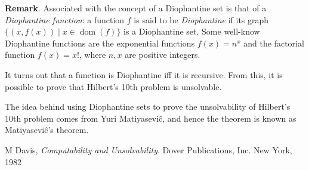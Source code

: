 \documentclass[12pt]{article}
\begin{document}
\textbf{Remark}.  Associated with the concept of a Diophantine set is that of a \emph{Diophantine function}: a function $f$ is said to be \emph{Diophantine} if its graph $\lbrace (x,f(x)) \mid x\in \operatorname{dom}(f)\rbrace$ is a Diophantine set.  Some well-know Diophantine functions are the exponential functions $f(x)=n^x$ and the factorial function $f(x)=x!$, where $n,x$ are positive integers.

It turns out that a function is Diophantine iff it is recursive.  From this, it is possible to prove that Hilbert's 10th problem is unsolvable.  

The idea behind using Diophantine sets to prove the unsolvability of Hilbert's 10th problem comes from Yuri Matiyasevi\^c, and hence the theorem is known as Matiyasevi\^c's theorem.

\begin{thebibliography}{8}
 M Davis, {\em Computability and Unsolvability}. Dover Publications, Inc. New York, 1982
\end{thebibliography}
\end{document}
